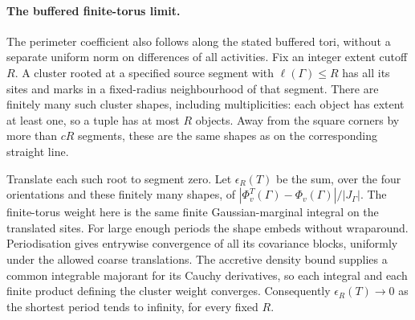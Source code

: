 \documentclass[11pt]{article}
\begin{document}
\paragraph{The buffered finite-torus limit.}
The perimeter coefficient also follows along the stated buffered tori, without a separate uniform norm on differences of all activities. Fix an integer extent cutoff $R$. A cluster rooted at a specified source segment with $\ell(\Gamma)\leq R$ has all its sites and marks in a fixed-radius neighbourhood of that segment. There are finitely many such cluster shapes, including multiplicities: each object has extent at least one, so a tuple has at most $R$ objects. Away from the square corners by more than $cR$ segments, these are the same shapes as on the corresponding straight line.

Translate each such root to segment zero. Let $\epsilon_R(T)$ be the sum, over the four orientations and these finitely many shapes, of $|\Phi^T_v(\Gamma)-\Phi_v(\Gamma)|/|J_\Gamma|$. The finite-torus weight here is the same finite Gaussian-marginal integral on the translated sites. For large enough periods the shape embeds without wraparound. Periodisation gives entrywise convergence of all its covariance blocks, uniformly under the allowed coarse translations. The accretive density bound supplies a common integrable majorant for its Cauchy derivatives, so each integral and each finite product defining the cluster weight converges. Consequently $\epsilon_R(T)\to0$ as the shortest period tends to infinity, for every fixed $R$.
\end{document}
